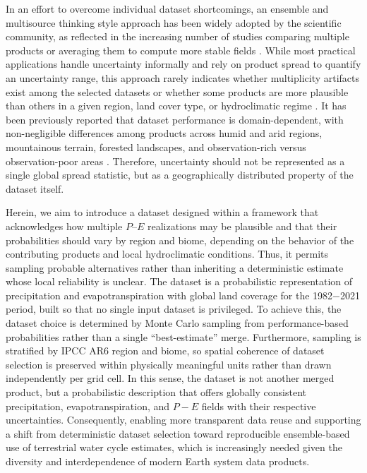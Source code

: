 \documentclass[essd, manuscript]{copernicus}
\begin{document}
In an effort to overcome individual dataset shortcomings, an ensemble and multisource thinking style approach has been widely adopted by the scientific community, as reflected in the increasing number of studies comparing multiple products or averaging them to compute more stable fields \citep{abbas_comprehensive_2026, thomson_agreement_2026}. While most practical applications handle uncertainty informally and rely on product spread to quantify an uncertainty range, this approach rarely indicates whether multiplicity artifacts exist among the selected datasets or whether some products are more plausible than others in a given region, land cover type, or hydroclimatic regime \citep{vargas_godoy_which_2025}. It has been previously reported that dataset performance is domain-dependent, with non-negligible differences among products across humid and arid regions, mountainous terrain, forested landscapes, and observation-rich versus observation-poor areas \citep{markonis_spatial_2024}. Therefore, uncertainty should not be represented as a single global spread statistic, but as a geographically distributed property of the dataset itself.

Herein, we aim to introduce a dataset designed within a framework that acknowledges how multiple $P–E$ realizations may be plausible and that their probabilities should vary by region and biome, depending on the behavior of the contributing products and local hydroclimatic conditions. Thus, it permits sampling probable alternatives rather than inheriting a deterministic estimate whose local reliability is unclear. The dataset is a probabilistic representation of precipitation and evapotranspiration with global land coverage for the 1982$-$2021 period, built so that no single input dataset is privileged. To achieve this, the dataset choice is determined by Monte Carlo sampling from performance-based probabilities rather than a single ``best-estimate'' merge. Furthermore, sampling is stratified by IPCC AR6 region and biome, so spatial coherence of dataset selection is preserved within physically meaningful units rather than drawn independently per grid cell. In this sense, the dataset is not another merged product, but a probabilistic description that offers globally consistent precipitation, evapotranspiration, and $P−E$ fields with their respective uncertainties. Consequently, enabling more transparent data reuse and supporting a shift from deterministic dataset selection toward reproducible ensemble-based use of terrestrial water cycle estimates, which is increasingly needed given the diversity and interdependence of modern Earth system data products.
\end{document}
